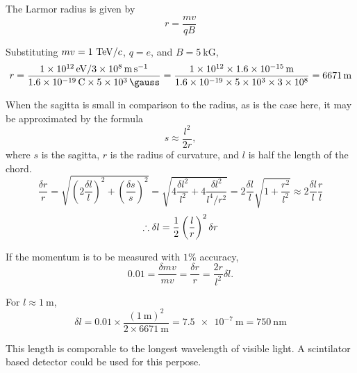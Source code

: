The Larmor radius is given by
\begin{equation}
  r = \frac{mv}{qB}
\end{equation}

Substituting $mv = 1~\text{TeV}/c$, $q = e$, and $B = 5~\mathrm{kG}$,
\begin{equation}
  r = \frac{
    \SI{1e12}{\electronvolt} / \SI{3e8}{\meter\per\second}
  }{
    \SI{1.6e-19}{\coulomb}\times\SI{5e3}{\gauss}
  }
  = \frac{
    \num{1e12}\times\SI{1.6e-15}{\meter}
  }{
    \num{1.6e-19}\times\num{5e3}\times\num{3e8}
  }
  = \SI{6671}{\meter}
\end{equation}

When the sagitta is small in comparison to the radius, as is the case here, it may be approximated by the formula
\begin{equation}
  s \approx \frac{l^2}{2r},
\end{equation}
where $s$ is the sagitta, $r$ is the radius of curvature, and $l$ is half the length of the chord.
\begin{equation}
  \frac{\delta r}{r}
  = \sqrt{ \left(2\frac{\delta l}{l}\right)^2 + \left(\frac{\delta s}{s}\right)^2 }
  = \sqrt{ 4\frac{{\delta l}^2}{l^2} + 4\frac{{\delta l}^2}{l^4/r^2} }
  = 2\frac{\delta l}{l} \sqrt{ 1 + \frac{r^2}{l^2} }
  \approx 2\frac{\delta l}{l} \frac{r}{l}
\end{equation}
\begin{equation}
  \therefore \delta l = \frac{1}{2} \left(\frac{l}{r}\right)^2 \delta r
\end{equation}

If the momentum is to be measured with $1\%$ accuracy,
\begin{equation}
  0.01 = \frac{\delta mv}{mv} = \frac{\delta r}{r} = \frac{2r}{l^2} \delta l.
\end{equation}

For $l\approx\SI{1}{\meter}$,
\begin{equation}
  \delta l = 0.01 \times \frac{(\SI{1}{\meter})^2}{2\times\SI{6671}{\meter}}
  = \SI{7.5e-7}{\meter} = \boxed{ \SI{750}{\nano\meter} }
\end{equation}

This length is comporable to the longest wavelength of visible light.
A scintilator based detector could be used for this perpose.

